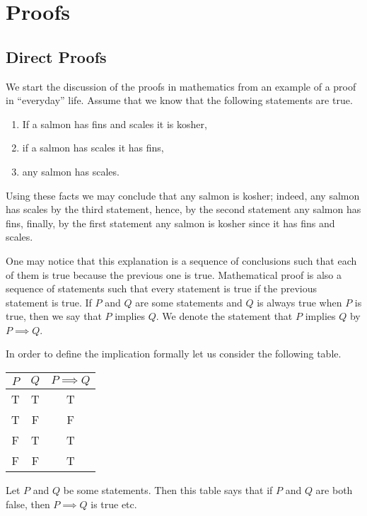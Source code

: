 \chapter{Proofs}
\section{Direct Proofs}

We start the discussion of the proofs in mathematics from an example of a proof
in ``everyday'' life. Assume that we know that the following statements are
true.
\begin{enumerate}
  \item If a salmon has fins and scales it is kosher,
  \item if a salmon has scales it has fins,
  \item any salmon has scales.
\end{enumerate}
Using these facts we may conclude that any salmon is kosher; indeed, any salmon
has scales by the third statement, hence, by the second statement any salmon has
fins, finally, by the first statement any salmon is kosher since it has fins and
scales.

One may notice that this explanation is a sequence of conclusions such that
each of them is true because the previous one is true.
Mathematical proof is also a sequence of statements such that every statement
is true if the previous statement is true. If $P$ and $Q$ are some statements
and $Q$ is always true when $P$ is true, then we say that $P$ implies $Q$.
We denote the statement that $P$ implies $Q$ by $P \implies Q$.



In order to define the implication formally let us consider the following table.
\begin{center}
  \begin{tabular}{ c | c | c }
    $P$ & $Q$ & $P \implies Q$ \\ \hline
    T   & T   & T \\
    T   & F   & F \\
    F   & T   & T \\
    F   & F   & T \\
  \end{tabular}
\end{center}
Let $P$ and $Q$ be some statements. Then this table says that if $P$ and $Q$
are both false, then $P \implies Q$ is true etc.

